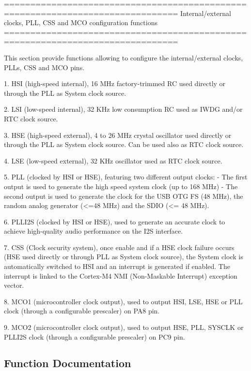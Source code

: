 \begin{DoxyVerb} ===============================================================================
      Internal/external clocks, PLL, CSS and MCO configuration functions
 ===============================================================================  

  This section provide functions allowing to configure the internal/external clocks,
  PLLs, CSS and MCO pins.
  
  1. HSI (high-speed internal), 16 MHz factory-trimmed RC used directly or through
     the PLL as System clock source.

  2. LSI (low-speed internal), 32 KHz low consumption RC used as IWDG and/or RTC
     clock source.

  3. HSE (high-speed external), 4 to 26 MHz crystal oscillator used directly or
     through the PLL as System clock source. Can be used also as RTC clock source.

  4. LSE (low-speed external), 32 KHz oscillator used as RTC clock source.   

  5. PLL (clocked by HSI or HSE), featuring two different output clocks:
      - The first output is used to generate the high speed system clock (up to 168 MHz)
      - The second output is used to generate the clock for the USB OTG FS (48 MHz),
        the random analog generator (<=48 MHz) and the SDIO (<= 48 MHz).

  6. PLLI2S (clocked by HSI or HSE), used to generate an accurate clock to achieve 
     high-quality audio performance on the I2S interface.
  
  7. CSS (Clock security system), once enable and if a HSE clock failure occurs 
     (HSE used directly or through PLL as System clock source), the System clock
     is automatically switched to HSI and an interrupt is generated if enabled. 
     The interrupt is linked to the Cortex-M4 NMI (Non-Maskable Interrupt) 
     exception vector.   

  8. MCO1 (microcontroller clock output), used to output HSI, LSE, HSE or PLL
     clock (through a configurable prescaler) on PA8 pin.

  9. MCO2 (microcontroller clock output), used to output HSE, PLL, SYSCLK or PLLI2S
     clock (through a configurable prescaler) on PC9 pin.\end{DoxyVerb}
 

\subsection{Function Documentation}
